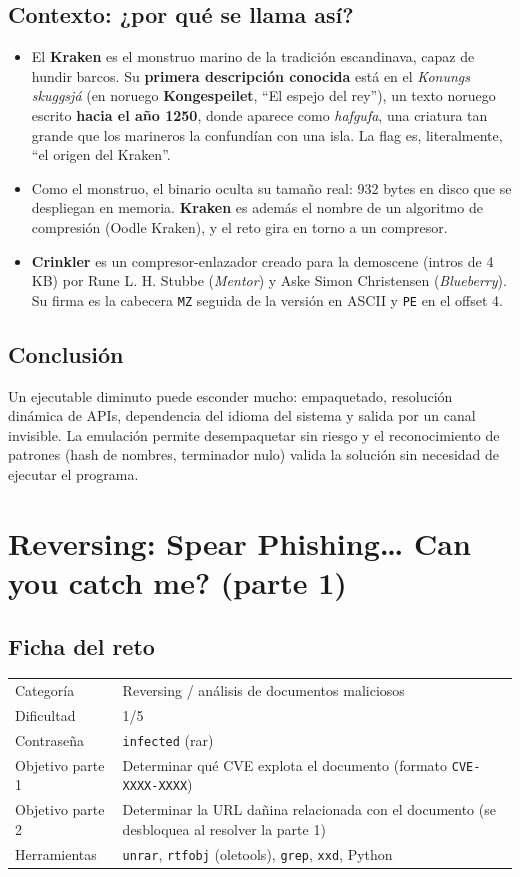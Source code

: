 \documentclass[11pt,a4paper]{article}
\begin{document}
\subsection{Contexto: ¿por qué se llama así?}
\begin{itemize}
  \item El \textbf{Kraken} es el monstruo marino de la tradición escandinava, capaz de hundir barcos. Su
        \textbf{primera descripción conocida} está en el \emph{Konungs skuggsjá} (en noruego \textbf{Kongespeilet},
        ``El espejo del rey''), un texto noruego escrito \textbf{hacia el año 1250}, donde aparece como
        \emph{hafgufa}, una criatura tan grande que los marineros la confundían con una isla. La flag es, literalmente,
        ``el origen del Kraken''.
  \item Como el monstruo, el binario oculta su tamaño real: 932 bytes en disco que se despliegan en memoria.
        \textbf{Kraken} es además el nombre de un algoritmo de compresión (Oodle Kraken), y el reto gira en torno a un
        compresor.
  \item \textbf{Crinkler} es un compresor-enlazador creado para la demoscene (intros de 4 KB) por Rune L. H. Stubbe
        (\emph{Mentor}) y Aske Simon Christensen (\emph{Blueberry}). Su firma es la cabecera \texttt{MZ} seguida de la
        versión en ASCII y \texttt{PE} en el offset 4.
\end{itemize}

\subsection{Conclusión}
Un ejecutable diminuto puede esconder mucho: empaquetado, resolución dinámica de APIs, dependencia del idioma del
sistema y salida por un canal invisible. La emulación permite desempaquetar sin riesgo y el reconocimiento de patrones
(hash de nombres, terminador nulo) valida la solución sin necesidad de ejecutar el programa.


\clearpage
\section{Reversing: Spear Phishing\dots{} Can you catch me? (parte 1)}

\subsection{Ficha del reto}
\begin{tabularx}{\linewidth}{@{}lX@{}}
\toprule
Categoría & Reversing / análisis de documentos maliciosos \\
Dificultad & 1/5 \\
Contraseña & \texttt{infected} (rar) \\
Objetivo parte 1 & Determinar qué CVE explota el documento (formato \texttt{CVE-XXXX-XXXX}) \\
Objetivo parte 2 & Determinar la URL dañina relacionada con el documento (se desbloquea al resolver la parte 1) \\
Herramientas & \texttt{unrar}, \texttt{rtfobj} (oletools), \texttt{grep}, \texttt{xxd}, Python \\
\bottomrule
\end{tabularx}
\end{document}
